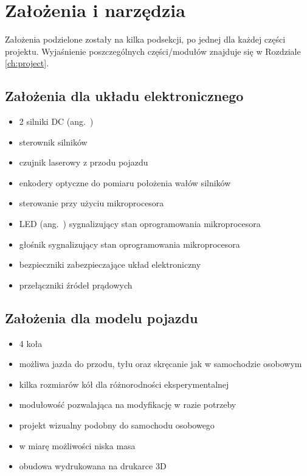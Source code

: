\section{Założenia i narzędzia}
\label{ch:zalozenia}
Założenia podzielone zostały na kilka podsekcji, po jednej dla każdej części projektu. Wyjaśnienie poszczególnych części/modułów znajduje się w Rozdziale \ref{ch:project}.

\subsection*{Założenia dla układu elektronicznego}
\begin{itemize}
    \item 2 silniki DC (ang.~)
    \item sterownik silników
    \item czujnik laserowy z przodu pojazdu
    \item enkodery optyczne do pomiaru położenia wałów silników
    \item sterowanie przy użyciu mikroprocesora
    \item LED (ang.~) sygnalizujący stan oprogramowania mikroprocesora
    \item głośnik sygnalizujący stan oprogramowania mikroprocesora
    \item bezpieczniki zabezpieczające układ elektroniczny
    \item przełączniki źródeł prądowych
\end{itemize}

\subsection*{Założenia dla modelu pojazdu}
\begin{itemize}
    \item 4 koła
    \item możliwa jazda do przodu, tyłu oraz skręcanie jak w samochodzie osobowym
    \item kilka rozmiarów kół dla różnorodności eksperymentalnej
    \item modułowość pozwalająca na modyfikację w razie potrzeby
    \item projekt wizualny podobny do samochodu osobowego
    \item w miarę możliwości niska masa
    \item obudowa wydrukowana na drukarce 3D
\end{itemize}

